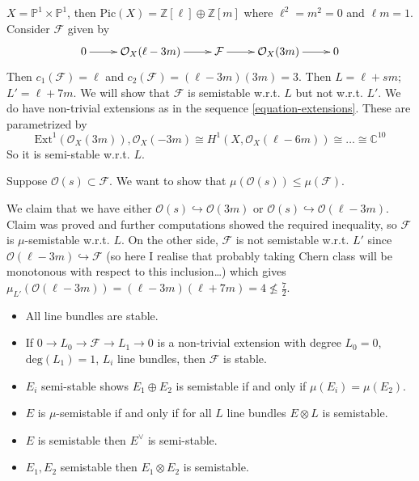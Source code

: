 \begin{example}
\label{msos-label-005}
$X=\mathbb{P}^1\times \mathbb{P}^1$, then
$\text{Pic}(X)
=\mathbb{Z}[\ell]\oplus\mathbb{Z}[m]$ where
$\ell^2=m^2=0$ and $\ell m=1$. Consider
$\mathcal{F}$ given by
\begin{equation}
\label{equation-extensions}
\xymatrix{
0\ar[r]&\mathcal{O}_X(\ell-3m)\ar[r]&
\mathcal{F}\ar[r]&\mathcal{O}_X(3m)
\ar[r]&0
}
\end{equation}
Then $c_1(\mathcal{F})=\ell$ and
$c_2(\mathcal{F})=(\ell-3m)(3m)=3$. Then
$L=\ell+sm$; $L'=\ell+7m$. We will show that
$\mathcal{F}$ is semistable w.r.t. $L$ but
not w.r.t. $L'$. We do have non-trivial
extensions as in the sequence
\ref{equation-extensions}. These are
parametrized by
$$
\text{Ext}^1(\mathcal{O}_X(3m)),
\mathcal{O}_X(-3m)\cong
H^{1}(X,\mathcal{O}_X(\ell-6m))\cong \ldots
\cong \mathbb{C}^{10}
$$
So it is semi-stable w.r.t. $L$.

Suppose $\mathcal{O}(s) \subset \mathcal{F}$.
We want to show that $\mu(\mathcal{O}(s))
\leq  \mu(\mathcal{F})$.

We claim that we have either
$\mathcal{O}(s)\hookrightarrow
\mathcal{O}(3m)$ or
$\mathcal{O}(s)\hookrightarrow
\mathcal{O}(\ell-3m)$. Claim was proved and
further computations showed the required
inequality, so $\mathcal{F}$ is
$\mu$-semistable w.r.t. $L$. On the other
side, $\mathcal{F}$ is not semistable w.r.t.
$L'$ since $\mathcal{O}(\ell-3m)
\hookrightarrow  \mathcal{F}$ (so here I
realise that probably taking Chern class will
be monotonous with respect to this
inclusion\ldots{}) which gives
$\mu_{L'}(\mathcal{O}(\ell-3m))=(\ell-3m)
(\ell+7m)=4\not
\leq \frac{7}{2}$.
\end{example}

\begin{example}
\label{example-results-on-mu-stability}
\begin{itemize}
\item All line bundles are stable.
\item If $0\to L_0 \to \mathcal{F} \to L_1
\to 0$ is a non-trivial extension
with degree $L_0=0$, $\text{deg}(L_1)=1$,
$L_i$ line bundles, then $\mathcal{F}$ is
stable.
\item $E_i$ semi-stable shows $E_1\oplus E_2$
is semistable if and only if
$\mu(E_i)=\mu(E_2)$.
\item $E$ is $\mu$-semistable if and only if
for all $L$ line bundles $E \otimes
L$ is semistable.
\item $E$ is semistable then $E^{\vee}$ is
semi-stable.
\item $E_1,E_2$ semistable then $E_1 \otimes
E_2$ is semistable.
\end{itemize}
\end{example}

